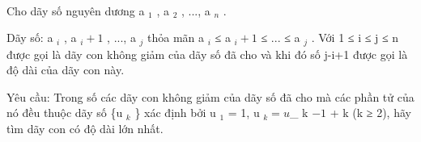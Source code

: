  

Cho dãy số nguyên dương a $_ 1 $ , a $_ 2 $ , ..., a $_ n $ .

Dãy số: a $_ i $ , a $_ i+1 $ , ..., a $_ j $ thỏa mãn a $_ i $ ≤ a $_ i+1 $ ≤ ... ≤ a $_ j $ . Với 1 ≤ i ≤ j ≤ n được gọi là dãy con không giảm của dãy số đã cho và khi đó số j-i+1 được gọi là độ dài của dãy con này.

Yêu cầu: Trong số các dãy con không giảm của dãy số đã cho mà các phần tử của nó đều thuộc dãy số \{u $_ k $ \} xác định bởi u $_ 1 $ = 1, u $_ k = u $_ k $ -1 $ + k (k ≥ 2), hãy tìm dãy con có độ dài lớn nhất.

\